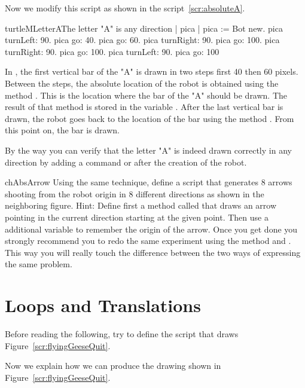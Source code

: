 Now we modify this script as shown in the script~\ref{scr:absoluteA}. 

\begin{scriptfig}{turtleMLetterA}{The letter "A" is any direction}\label{scr:absoluteA}
| pica  |
pica := Bot new.
pica turnLeft: 90.
pica go: 40.
pica go: 60.
pica turnRight: 90.
pica go: 100.
pica turnRight: 90.
pica go: 100.
pica turnLeft: 90.
pica go: 100\end{scriptfig}

In , the first vertical bar of the "A"
is drawn in two steps first 40 then 60 pixels. Between the steps, the absolute location of the robot is obtained using the method . This is the location where the bar of the "A" should be drawn. The result of that method is stored in the variable . After the last vertical bar is drawn, the robot goes back to the location of the bar using the method . From this point on, the bar is drawn.


By the way you can verify that the letter "A" is indeed drawn correctly in any direction by adding a command  or
 after the creation of the robot. 


 
\begin{exofig}{chAbsArrow}\label{exo:arrows}
Using the same technique, define a script that generates 8 arrows shooting from the robot origin in 8 different directions as shown in the neighboring figure. 
Hint: Define first a method called  that draws an arrow pointing in the current 
direction starting at the given point. Then use a additional variable to remember the origin of the arrow.
Once you get done you strongly recommend you to redo the same experiment using the method \go and \jump. This way you will really touch the difference between the two ways of expressing 
the same problem.
\end{exofig}

\section{Loops and Translations}
Before reading the following, try to define the script that draws Figure~\ref{scr:flyingGeeseQuit}.

Now we explain how we can produce the drawing shown in Figure~\ref{scr:flyingGeeseQuit}. 

